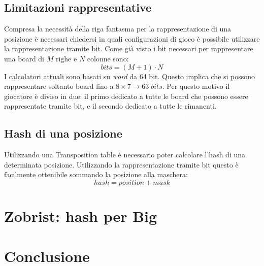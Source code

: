 \documentclass[a4paper]{article}
\begin{document}

\subsection{Limitazioni rappresentative}
Compresa la necessità della riga fantasma per la rappresentazione di una 
posizione è necessari chiedersi in quali configurazioni di gioco è possibile
utilizzare la rappresentazione tramite bit. Come già visto i bit necessari per
rappresentare una board di $M$ righe e $N$ colonne sono:
\begin{equation*}
  bits = (M + 1) \cdot N
\end{equation*}
I calcolatori attuali sono basati su \emph{word} da 64 bit. Questo implica che
si possono rappresentare soltanto board fino a $8 \times 7 \xrightarrow{} 63\; 
bits$. Per questo motivo il giocatore è diviso in due: il primo dedicato a tutte 
le board che possono essere rappresentate tramite bit, e il secondo dedicato a 
tutte le rimanenti.

\subsection{Hash di una posizione}
Utilizzando una Transposition table è necessario poter calcolare l'hash di una
determinata posizione. Utilizzando la rappresentazione tramite bit questo è 
facilmente ottenibile sommando la posizione alla maschera:
\begin{equation*}
  hash = position + mask
\end{equation*}

\section{Zobrist: hash per Big}

\section{Conclusione}
\end{document}
